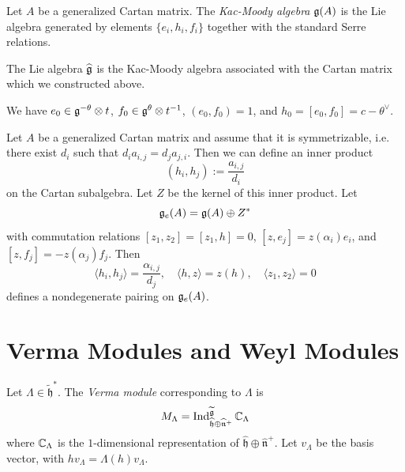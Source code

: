 \begin{definition}
  Let $A$ be a generalized Cartan matrix.
  The \emph{Kac-Moody algebra} $\mathfrak{g}(A)$
  is the Lie algebra generated by elements
  $\{e_i, h_i, f_i\}$ together with the
  standard Serre relations.
\end{definition}

\begin{theorem}
  The Lie algebra $\widehat{\mathfrak{g}}$
  is the Kac-Moody algebra associated with
  the Cartan matrix which we constructed
  above.
\end{theorem}

\begin{remark}
  We have
  $e_0 \in \mathfrak{g}^{-\theta} \otimes t$,
  $f_0 \in \mathfrak{g}^\theta \otimes t^{-1}$,
  $(e_0, f_0) = 1$, and
  $h_0 = [e_0, f_0] = c - \theta^\vee$.
\end{remark}

\begin{remark}
  Let $A$ be a generalized Cartan matrix and
  assume that it is symmetrizable, i.e.
  there exist $d_i$ such that
  $d_i a_{i, j} = d_j a_{j, i}$. Then
  we can define an inner product
  \[
    (h_i, h_j) := \frac{a_{i, j}}{d_i}
  \]
  on the Cartan subalgebra. Let
  $Z$ be the kernel of this inner product.
  Let
  \[\mathfrak{g}_e(A) = \mathfrak{g}(A) \oplus Z^*\]
  with commutation relations
  $[z_1, z_2] = [z_1, h] = 0$,
  $[z, e_j] = z(\alpha_i) e_i$,
  and $[z, f_j] = -z(\alpha_j) f_j$. Then
  \[
    \langle h_i, h_j \rangle = \frac{\alpha_{i, j}}{d_j},
    \quad \langle h, z \rangle = z(h), \quad
    \langle z_1, z_2 \rangle = 0
  \]
  defines a nondegenerate pairing
  on $\mathfrak{g}_e(A)$.
\end{remark}

\section{Verma Modules and Weyl Modules}

\begin{definition}
  Let $\Lambda \in \widetilde{\mathfrak{h}}^*$.
  The \emph{Verma module}
  corresponding to $\Lambda$ is
  \[
    M_\Lambda
    = \operatorname{Ind}_{\widehat{\mathfrak{h}} \oplus \widehat{\mathfrak{n}}^+}^{\widetilde{\mathfrak{g}}} \mathbb{C}_\Lambda
  \]
  where $\mathbb{C}_{\Lambda}$ is the $1$-dimensional
  representation of
  $\widehat{\mathfrak{h}} \oplus \widehat{\mathfrak{n}}^+$.
  Let $v_\Lambda$ be the basis vector, with
  $h v_\Lambda = \Lambda(h) v_\Lambda$.
\end{definition}

